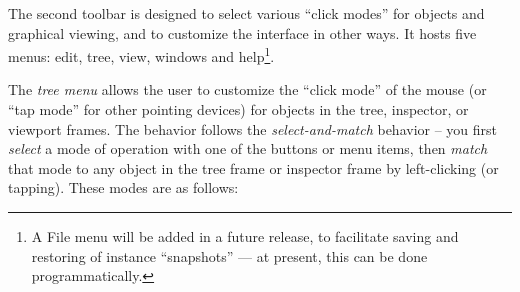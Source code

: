 \documentclass [11pt]{book}
\begin{document}
The second toolbar is designed to select various ``click modes'' for
objects and graphical viewing, and to customize the interface in other
ways. It hosts five menus: edit, tree, view, windows and
help\footnote{A File menu will be added in a future release, to
facilitate saving and restoring of instance ``snapshots'' --- at
present, this can be done programmatically.}.



The \emph{tree menu} allows the user to customize the ``click mode'' of the
mouse (or ``tap mode'' for other pointing devices) for objects in the
tree, inspector, or viewport frames. The behavior follows the \emph{select-and-match} behavior -- you first \emph{select} a mode of operation with one of the buttons or menu items, 
then \emph{match} that mode to any object in the tree frame or inspector frame by
left-clicking (or tapping). These modes are as follows:
\end{document}

